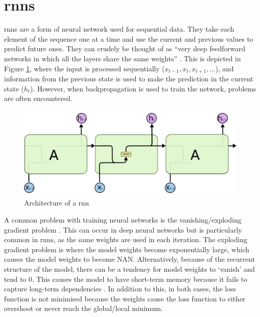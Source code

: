 \section{\acrlong{rnn}s}\label{sec:background_rnns}
\acrfull{rnn}s are a form of neural network used for sequential data. They take each element of the sequence one at a time and use the current and previous values to predict future ones. They can crudely be thought of as ``very deep feedforward networks in which all the layers share the same weights'' \citep{Yann}. This is depicted in Figure \ref{fig:rnn_architecture}, where the input is processed sequentially ($x_{t-1}, x_{t}, x_{t+1},\ldots$), and information from the previous state is used to make the prediction in the current state ($h_{t}$). However, when backpropagation is used to train the network, problems are often encountered.

\begin{figure}[h]
    \centering
    \includegraphics[height=4.5cm,trim={0 0 0cm 0cm},clip]{paper/images/rnn.png}
    \caption{Architecture of a \acrlong{rnn} \citep{olah2015understanding}}
    \label{fig:rnn_architecture}
\end{figure}

A common problem with training neural networks is the vanishing/exploding gradient problem \citep{hochreiter1997long}. This can occur in deep neural networks but is particularly common in \acrshort{rnn}s, as the same weights are used in each iteration. The exploding gradient problem is where the model weights become exponentially large, which causes the model weights to become NAN. Alternatively, because of the recurrent structure of the model, there can be a tendency for model weights to `vanish' and tend to 0. This causes the model to have short-term memory because it fails to capture long-term dependencies \citep{chung2014empirical}. In addition to this, in both cases, the loss function is not minimised because the weights cause the loss function to either overshoot or never reach the global/local minimum.

